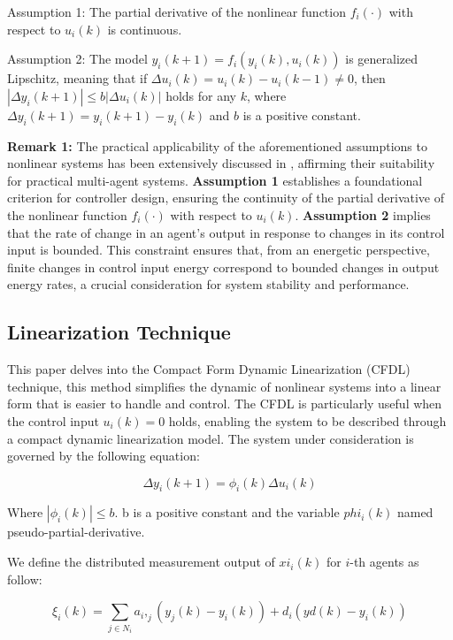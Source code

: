 \documentclass[journal,onecolumn]{IEEEtran}
\begin{document}
Assumption 1: The partial derivative of the nonlinear function \( f_i(\cdot) \) with respect to \( u_i(k) \) is continuous.

Assumption 2: The model \( y_i(k + 1) = f_i(y_i(k), u_i(k)) \) is generalized Lipschitz, meaning that if \( \Delta u_i(k) = u_i(k) - u_i(k - 1) \neq 0 \), then \( | \Delta y_i(k + 1) | \leq b |\Delta u_i(k)| \) holds for any \( k \), where \( \Delta y_i(k + 1) = y_i(k + 1) - y_i(k) \) and \( b \) is a positive constant.

\textbf{Remark 1:} The practical applicability of the aforementioned assumptions to nonlinear systems has been extensively discussed in \cite{reference24}, affirming their suitability for practical multi-agent systems. \textbf{Assumption 1} establishes a foundational criterion for controller design, ensuring the continuity of the partial derivative of the nonlinear function $f_i(\cdot)$ with respect to $u_i(k)$. \textbf{Assumption 2} implies that the rate of change in an agent's output in response to changes in its control input is bounded. This constraint ensures that, from an energetic perspective, finite changes in control input energy correspond to bounded changes in output energy rates, a crucial consideration for system stability and performance.

\subsection{Linearization Technique}

This paper delves into the Compact Form Dynamic Linearization (CFDL) technique, this method simplifies the dynamic of nonlinear systems into a linear form that is easier to handle and control. The CFDL is particularly useful when the control input \(u_i(k) = 0\) holds, enabling the system to be described through a compact dynamic linearization model. The system under consideration is governed by the following equation:


\begin{equation}
    \label{model 2}
    \Delta y_i(k+1)=\phi_i(k)\Delta u_i(k)
\end{equation}

Where \( | \phi_i(k) | \leq b\). b is a positive constant and the variable \(phi_i(k)\) named pseudo-partial-derivative.

We define the distributed measurement output of \(xi_i(k)\) for \(i\)-th agents as follow:

\begin{equation}
    \label{model 3}
    \xi_i(k) = \sum_{j \in N_i} a_i,_j( y_j(k)-y_i(k)) + d_i(yd(k) - y_i(k ))
\end{equation}
\end{document}
